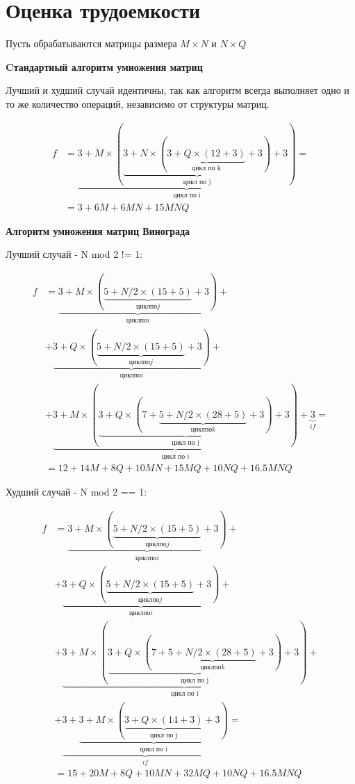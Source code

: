 \section{Оценка трудоемкости}

Пусть обрабатываются матрицы размера $M \times N$ и $N \times Q$

\textbf{Cтандартный алгоритм умножения матриц}

Лучший и худший случай идентичны, так как алгоритм всегда выполняет одно и то же количество операций, независимо от структуры матриц.

\begin{equation}
    \begin{aligned}
    f &= \underbrace{3 + M \times (\underbrace{3 + N \times (\underbrace{3 + Q \times (12 + 3)}_{\text{цикл по k}} + 3)}_{\text{цикл по j}} + 3)}_{\text{цикл по i}} = \\
    &= 3+6M+6MN+15MNQ
    \end{aligned}
\end{equation}

\textbf{Алгоритм умножения матриц Винограда}

Лучший случай - N mod 2 != 1:

\begin{equation}
    \begin{aligned}
    f &=
    \underbrace{3 + M \times (\underbrace{
    5 + N/2 \times (15+ 5)
    }_{цикл по j} + 3)}_{цикл по i} + \\
    &+ \underbrace{3 + Q \times (\underbrace{
    5 + N/2 \times (15+ 5)
    }_{цикл по j} + 3)}_{цикл по i} + \\
    &+ \underbrace{3 +M \times (\underbrace{3 + Q \times (7 + \underbrace{
    5 + N/2 \times (28 + 5)
    }_{цикл по k} + 3)}_{\text{цикл по j}} + 3)}_{\text{цикл по i}} +
    \underbrace{3}_{if} = \\
    &= 12+14M+8Q+10MN+15MQ+10NQ+16.5MNQ
    \end{aligned}
\end{equation}

Худший случай - N mod 2 == 1:

\begin{equation}
    \begin{aligned}
    f &=
    \underbrace{3 + M \times (\underbrace{
    5 + N/2 \times (15+ 5)
    }_{цикл по j} + 3)}_{цикл по i} + \\
    &+ \underbrace{3 + Q \times (\underbrace{
    5 + N/2 \times (15+ 5)
    }_{цикл по j} + 3)}_{цикл по i} + \\
    &+ \underbrace{3 + M \times (\underbrace{3 + Q \times (7 + \underbrace{
    5 + N/2 \times (28 + 5)
    }_{цикл по k} + 3)}_{\text{цикл по j}} + 3)}_{\text{цикл по i}} + \\
    &+ \underbrace{3 +
    \underbrace{3 + M \times (\underbrace{3 + Q \times (14 + 3)}_{\text{цикл по j}} + 3)}_{\text{цикл по i}}
    }_{if} = \\
    &= 15+20M+8Q+10MN+32MQ+10NQ+16.5MNQ
    \end{aligned}
\end{equation}

